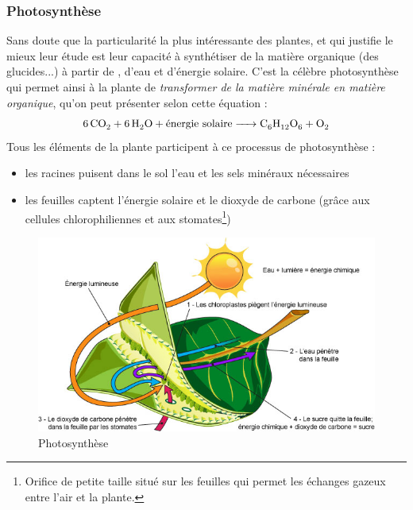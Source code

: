 \subsubsection{Photosynthèse}


Sans doute que la particularité la plus intéressante des plantes, et qui justifie le mieux leur étude est leur capacité à synthétiser de la matière organique (des glucides...) à partir de , d'eau et d'énergie solaire. C'est la célèbre photosynthèse qui permet ainsi à la plante de \textit{transformer de la matière minérale en matière organique}, qu'on peut présenter selon cette équation : 
\[
	\ce{6CO2 + 6H2O + \text{énergie solaire} -> C6H12O6 + O2 }
\]
Tous les éléments de la plante participent à ce processus de photosynthèse :
\begin{itemize}
	\item les racines puisent dans le sol l'eau et les sels minéraux nécessaires		
	\item les feuilles captent l'énergie solaire et le dioxyde de carbone 
  (grâce aux cellules chlorophiliennes 
  et aux stomates\footnote{Orifice de petite taille situé sur les feuilles 
  qui permet les échanges gazeux entre l'air et la plante.})
\end{itemize}

\begin{figure}[h]
	\begin{center}
  \includegraphics[scale=0.51]{./img/photosynthese.jpg}
  \caption{Photosynthèse}
  \label{fig:photosynthèse}
	\end{center}
\end{figure}

